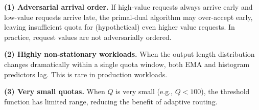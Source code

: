 \textbf{(1) Adversarial arrival order.} If high-value requests always arrive early and low-value requests arrive late, the primal-dual algorithm may over-accept early, leaving insufficient quota for (hypothetical) even higher value requests. In practice, request values are not adversarially ordered.

\textbf{(2) Highly non-stationary workloads.} When the output length distribution changes dramatically within a single quota window, both EMA and histogram predictors lag. This is rare in production workloads.

\textbf{(3) Very small quotas.} When $Q$ is very small (e.g., $Q < 100$), the threshold function has limited range, reducing the benefit of adaptive routing.
